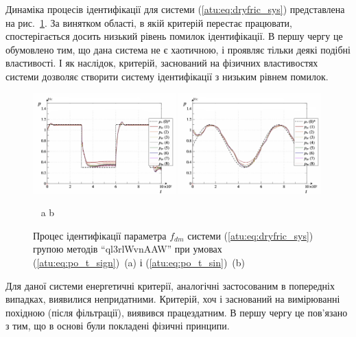 \documentclass[a4paper,13pt]{atuaref}
\begin{document}
Динаміка процесів ідентифікації для системи (\ref{atu:eq:dryfric_sys})
представлена на рис.~\ref{atu:f:fric_id}.
За винятком області, в якій критерій перестає працювати,
спостерігається досить низький рівень помилок ідентифікації. В першу чергу це
обумовлено тим, що дана система не є хаотичною, і проявляє тільки деякі подібні
властивості. І як наслідок, критерій, заснований на фізичних властивостях
системи дозволяє створити систему ідентифікації з низьким рівнем помилок.

\begin{figure}[htb!]
\centerline{
  \includegraphics[width=0.49\textwidth]{p5/p/cha/fric/ql3rlWvnAAW/fric_id-p_t_p_ql3rlWvnAAW_sign_xl.png}
  \hfill
  \includegraphics[width=0.49\textwidth]{p5/p/cha/fric/ql3rlWvnAAW/fric_id-p_t_p_ql3rlWvnAAW_sin_xl.png}
}
  \vspace{-1.5ex}
  \begin{center}
    ~ \hfill a \hfill\hfill b \hfill ~
  \end{center}
  \vspace{-2.5ex}
\caption{
  Процес ідентифікації параметра $f_{dm}$ системи (\ref{atu:eq:dryfric_sys}) групою методів ``ql3rlWvnAAW''
  при умовах (\ref{atu:eq:po_t_sign})~(a) і  (\ref{atu:eq:po_t_sin})~(b)
}
\label{atu:f:fric_id}
\end{figure}

Для даної системи енергетичні критерії, аналогічні застосованим в попередніх
випадках, виявилися непридатними. Критерій, хоч і заснований на вимірюванні
похідною (після фільтрації), виявився працездатним. В першу чергу це пов'язано
з тим, що в основі були покладені фізичні принципи.
\end{document}

